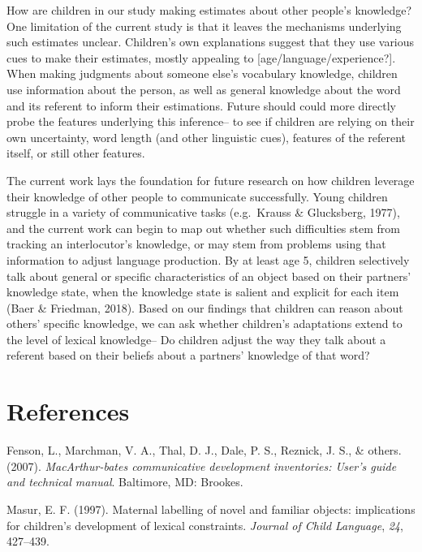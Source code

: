 \documentclass[10pt, letterpaper]{article}
\newenvironment{CSLReferences}%
  {}%
  {\par}
\begin{document}
How are children in our study making estimates about other people's
knowledge? One limitation of the current study is that it leaves the
mechanisms underlying such estimates unclear. Children's own
explanations suggest that they use various cues to make their estimates,
mostly appealing to {[}age/language/experience?{]}. When making
judgments about someone else's vocabulary knowledge, children use
information about the person, as well as general knowledge about the
word and its referent to inform their estimations. Future should could
more directly probe the features underlying this inference-- to see if
children are relying on their own uncertainty, word length (and other
linguistic cues), features of the referent itself, or still other
features.

The current work lays the foundation for future research on how children
leverage their knowledge of other people to communicate successfully.
Young children struggle in a variety of communicative tasks (e.g.~Krauss
\& Glucksberg, 1977), and the current work can begin to map out whether
such difficulties stem from tracking an interlocutor's knowledge, or may
stem from problems using that information to adjust language production.
By at least age 5, children selectively talk about general or specific
characteristics of an object based on their partners' knowledge state,
when the knowledge state is salient and explicit for each item (Baer \&
Friedman, 2018). Based on our findings that children can reason about
others' specific knowledge, we can ask whether children's adaptations
extend to the level of lexical knowledge-- Do children adjust the way
they talk about a referent based on their beliefs about a partners'
knowledge of that word?

\vspace{1em} 

\hypertarget{references}{%
\section{References}\label{references}}

\setlength{\parindent}{-0.1in} 
\setlength{\leftskip}{0.125in}

\noindent

\hypertarget{refs}{}
\begin{CSLReferences}{1}{0}
\leavevmode\hypertarget{ref-fenson2007}{}%
Fenson, L., Marchman, V. A., Thal, D. J., Dale, P. S., Reznick, J. S.,
\& others. (2007). \emph{MacArthur-bates communicative development
inventories: User's guide and technical manual}. Baltimore, MD: Brookes.

\leavevmode\hypertarget{ref-masur1997}{}%
Masur, E. F. (1997). {Maternal labelling of novel and familiar objects:
implications for children's development of lexical constraints}.
\emph{Journal of Child Language}, \emph{24}, 427--439.

\end{CSLReferences}


\end{document}
